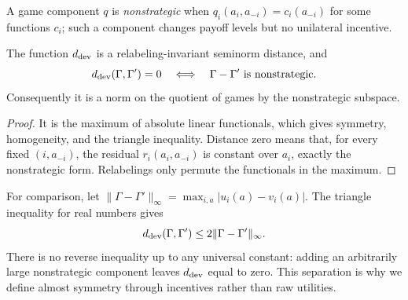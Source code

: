 A game component $q$ is \emph{nonstrategic} when
$q_i(a_i,a_{-i})=c_i(a_{-i})$ for some functions $c_i$; such a component changes payoff levels but no unilateral incentive.

\begin{proposition}
\label{prop:quotient}
The function $d_{\mathrm{dev}}$ is a relabeling-invariant seminorm distance, and
\[
d_{\mathrm{dev}}(\Gamma,\Gamma')=0
\quad\Longleftrightarrow\quad
\Gamma-\Gamma'\text{ is nonstrategic}.
\]
Consequently it is a norm on the quotient of games by the nonstrategic subspace.
\end{proposition}
\begin{proof}
It is the maximum of absolute linear functionals, which gives symmetry, homogeneity, and the triangle inequality.  Distance zero means that, for every fixed $(i,a_{-i})$, the residual $r_i(a_i,a_{-i})$ is constant over $a_i$, exactly the nonstrategic form.  Relabelings only permute the functionals in the maximum.
\end{proof}

For comparison, let
$\|\Gamma-\Gamma'\|_\infty=\max_{i,a}|u_i(a)-v_i(a)|$.
The triangle inequality for real numbers gives
\begin{equation}
d_{\mathrm{dev}}(\Gamma,\Gamma')
\le 2\|\Gamma-\Gamma'\|_\infty.
\label{eq:raw-upper}
\end{equation}
There is no reverse inequality up to any universal constant: adding an arbitrarily large nonstrategic component leaves $d_{\mathrm{dev}}$ equal to zero.  This separation is why we define almost symmetry through incentives rather than raw utilities.
